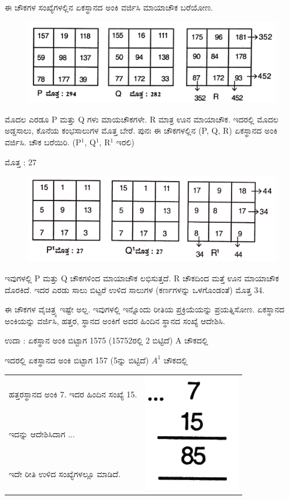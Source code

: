 ಈ ಚೌಕಗಳ ಸಂಖ್ಯೆಗಳಲ್ಲಿನ ಏಕಸ್ಥಾನದ ಅಂಕಿ ವರ್ಜಿಸಿ ಮಾಯಾಚೌಕ ಬರೆಯೋಣ.
\begin{figure}[H]
\includegraphics{src/figures/chap7/fig7-11.jpg}
\end{figure}

ಮೊದಲ ಎರಡೂ P ಮತ್ತು Q ಗಳು ಮಾಯಚೌಕಗಳೇ. R ಮಾತ್ರ ಊನ ಮಾಯಾಚೌಕ. ಇದರಲ್ಲಿ ಮೊದಲ ಅಡ್ಡಸಾಲು, ಕೊನೆಯ ಕಂಭಸಾಲುಗಳ ಮೊತ್ತ ಬೇರೆ. ಪುನಃ ಈ ಚೌಕಗಳಲ್ಲಿನ (P, Q, R) ಏಕಸ್ಥಾನದ ಅಂಕಿ ವರ್ಜಿಸಿ. ಚೌಕ ಬರೆಯಿರಿ. (P$^1$, Q$^1$, R$^1$ ಇರಲಿ)

ಮೊತ್ತ : 27
\begin{figure}[H]
\includegraphics[scale=.9]{src/figures/chap7/fig7-12.jpg}
\end{figure}

ಇವುಗಳಲ್ಲಿ P ಮತ್ತು Q ಚೌಕಗಳಿಂದ ಮಾಯಾಚೌಕ ಲಭಿಸುತ್ತದೆ. R ಚೌಕದಿಂದ ಮತ್ತೆ ಊನ ಮಾಯಾಚೌಕ ದೊರಕಿದೆ. ಇದರ ಎರಡು ಸಾಲು ಬಿಟ್ಟರೆ ಉಳಿದ ಸಾಲುಗಳ (ಕರ್ಣ\-ಗಳನ್ನು ಒಳಗೊಂಡಂತೆ) ಮೊತ್ತ 34.

ಈ ಚೌಕಗಳ ವೈಚಿತ್ರ್ಯ ಇಷ್ಟೇ ಅಲ್ಲ. ಇವುಗಳಲ್ಲಿ ಇನ್ನೊಂದು ರೀತಿಯ ಪ್ರಕ್ರಿಯೆಯನ್ನು ಪ್ರಯತ್ನಿಸೋಣ. ಏಕಸ್ಥಾನದ ಅಂಕಿಯನ್ನು ವರ್ಜಿಸಿ, ಹತ್ತರ, ಸ್ಥಾನದ ಅಂಕಿಗೆ ಅದರ ಹಿಂದಿನ ಸ್ಥಾನದ ಸಂಖ್ಯೆ ಆದೇಶಿಸಿ.

ಉದಾ : ಏಕಸ್ಥಾನ ಅಂಕಿ ಬಿಟ್ಟಾಗ 1575 (15752ರಲ್ಲಿ 2 ಬಿಟ್ಟಿದೆ) A ಚೌಕದಲ್ಲಿ

ಇದರಲ್ಲಿ ಏಕಸ್ಥಾನದ ಅಂಕಿ ಬಿಟ್ಟಾಗ 157 (5ನ್ನು ಬಿಟ್ಟಿದೆ) $A^1$ ಚೌಕದಲ್ಲಿ

\begin{tabular}{ll}
ಹತ್ತರಸ್ಥಾನದ ಅಂಕಿ 7. ಇದರ ಹಿಂದಿನ ಸಂಖ್ಯೆ 15. & \multirow{3}{2cm}{\includegraphics[scale=.8]{src/figures/chap7/fig7-33.jpg}}\\
ಇದನ್ನು ಆದೇಶಿಸಿದಾಗ ... & \\
ಇದೇ ರೀತಿ ಉಳಿದ ಸಂಖ್ಯೆಗಳಲ್ಲೂ ಮಾಡಿದೆ.
\end{tabular}

